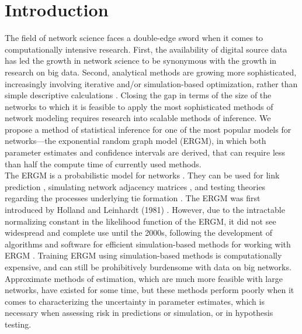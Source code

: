 \documentclass[10pt, conference, compsocconf]{IEEEtran}
\begin{document}
\section{Introduction}
The field of network science faces a double-edge sword when it comes to computationally intensive research. First, the availability of digital source data has led the growth in network science to be synonymous with the growth in research on big data. %
Second, analytical methods are growing more sophisticated, increasingly involving iterative and/or simulation-based optimization, rather than simple descriptive calculations \cite{snijders2011statistical}.  Closing the gap in terms of the size of the networks to which it is feasible to apply the most sophisticated methods of network modeling requires research into scalable methods of inference. We propose a method of statistical inference for one of the most popular models for networks---the exponential random graph model (ERGM), in which both parameter estimates and confidence intervals are derived, that can require less than half the compute time of currently used methods. \\
\indent The ERGM is a probabilistic model for networks \cite{Wasserman.1996,robins.pattison.2007}. They can be used for link prediction \cite{lu2010supervised, Desmarais:2011ieee}, simulating network adjacency matrices \cite{hackney2006agent}, and testing theories regarding the processes underlying tie formation \cite{goodreau2009birds}. The ERGM was first introduced by Holland and Leinhardt (1981) \cite{holland1981exponential}. However, due to the intractable normalizing constant in the likelihood function of the ERGM, it did not see widespread and complete use until the 2000s, following the development of algorithms and software for efficient simulation-based methods for working with ERGM \cite{snijders2002markov}. Training ERGM using simulation-based methods is computationally expensive, and can still be prohibitively burdensome with data on big networks. Approximate methods of estimation, which are much more feasible with large networks, have existed for some time, but these methods perform poorly when it comes to characterizing the uncertainty in parameter estimates, which is necessary when assessing risk in predictions or simulation, or in hypothesis testing.\\
\end{document}
